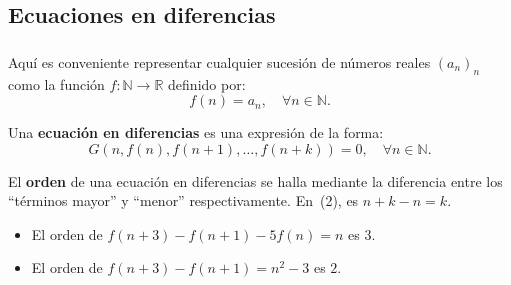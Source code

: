 \subsection{Ecuaciones en diferencias}

\begin{frame}
\frametitle{\subsecname}

Aquí es conveniente representar cualquier sucesión de números reales $(a_{n})_{n} $ como la función $f\colon\mathds{N}\rightarrow\mathds{R}$ definido por: \[ f(n)=a_{n},\quad\forall n\in\mathds{N}. \]

\begin{definition}
	Una \textbf{ecuación en diferencias} es una expresión de la forma:
		\begin{equation}\label{eq:diffeq}
			G\left(n,f(n),f\left(n+1\right),\ldots,f\left(n+k\right)\right)=0,\quad\forall n\in\mathds{N}.
		\end{equation}
\end{definition}

El \textbf{orden} de una ecuación en diferencias se halla mediante la diferencia entre los ``términos mayor'' y ``menor'' respectivamente. En~(2), es \alert{$n+k-n=k$}.%

\begin{example}
	\begin{itemize}
		\item El \alert{orden} de $f\left(n+3\right)-f\left(n+1\right)-5f(n)=n$ es \alert{$3$}.
		\item El \alert{orden} de $f\left(n+3\right)-f\left(n+1\right)=n^{2}-3$ es \alert{$2$}.
	\end{itemize}
\end{example}
\end{frame}


